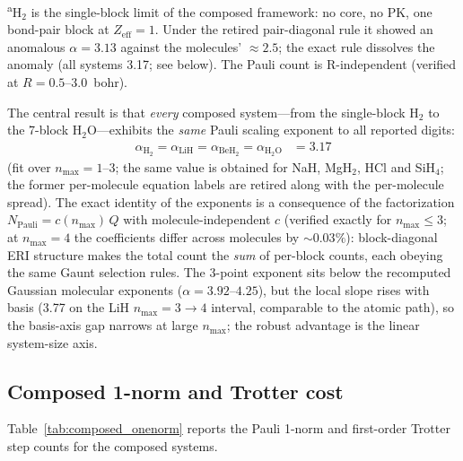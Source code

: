 \documentclass[aps,pra,twocolumn,superscriptaddress,longbibliography]{revtex4-2}
\begin{document}
{\footnotesize \textsuperscript{a}H$_2$ is the single-block limit of
the composed framework: no core, no PK, one bond-pair block at
$Z_{\mathrm{eff}} = 1$.  Under the retired pair-diagonal rule it showed
an anomalous $\alpha = 3.13$ against the molecules' $\approx 2.5$; the
exact rule dissolves the anomaly (all systems 3.17; see below).
The Pauli count is R-independent (verified at $R = 0.5$--$3.0$~bohr).}

The central result is that \emph{every} composed system---from the
single-block H$_2$ to the 7-block H$_2$O---exhibits the \emph{same}
Pauli scaling exponent to all reported digits:
\begin{align}
  \alpha_{\mathrm{H}_2} = \alpha_{\mathrm{LiH}} = \alpha_{\mathrm{BeH}_2}
    = \alpha_{\mathrm{H}_2\mathrm{O}} &= 3.17
  \label{eq:alpha_lih}
\end{align}
(fit over $n_{\max} = 1$--$3$; the same value is obtained for NaH,
MgH$_2$, HCl and SiH$_4$; the former per-molecule equation labels are
retired along with the per-molecule spread).  The exact
identity of the exponents is a consequence of the factorization
$N_{\mathrm{Pauli}} = c(n_{\max})\,Q$ with molecule-independent
$c$ (verified exactly for $n_{\max} \le 3$; at $n_{\max} = 4$ the
coefficients differ across molecules by $\sim 0.03\%$): block-diagonal
ERI structure makes the total count the \emph{sum} of per-block counts,
each obeying the same Gaunt selection rules.  The 3-point exponent sits
below the recomputed Gaussian molecular exponents
($\alpha = 3.92$--$4.25$), but the local slope rises with basis
(3.77 on the LiH $n_{\max} = 3 \to 4$ interval, comparable to the
atomic path), so the basis-axis gap narrows at large $n_{\max}$; the
robust advantage is the linear system-size axis.


\subsection{Composed 1-norm and Trotter cost}
\label{sec:composed_onenorm}

Table~\ref{tab:composed_onenorm} reports the Pauli 1-norm and
first-order Trotter step counts for the composed systems.
\end{document}
